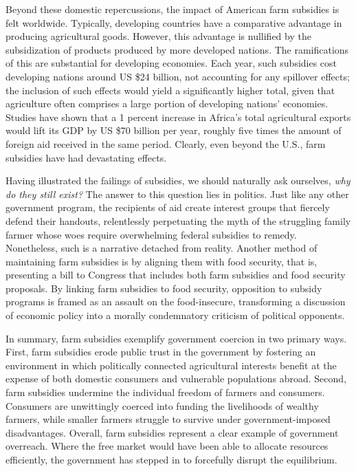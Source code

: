 Beyond these domestic repercussions, the impact of American farm subsidies is felt worldwide. Typically, developing countries have a comparative advantage in producing agricultural goods. However, this advantage is nullified by the subsidization of products produced by more developed nations. The ramifications of this are substantial for developing economies. Each year, such subsidies cost developing nations around US \$24 billion, not accounting for any spillover effects; the inclusion of such effects would yield a significantly higher total, given that agriculture often comprises a large portion of developing nations’ economies. Studies have shown that a 1 percent increase in Africa’s total agricultural exports would lift its GDP by US \$70 billion per year, roughly five times the amount of foreign aid received in the same period. Clearly, even beyond the U.S., farm subsidies have had devastating effects. 

Having illustrated the failings of subsidies, we should naturally ask ourselves, \emph{why do they still exist?}  The answer to this question lies in politics. Just like any other government program, the recipients of aid create interest groups that fiercely defend their handouts, relentlessly perpetuating the myth of the struggling family farmer whose woes require overwhelming federal subsidies to remedy. Nonetheless, such is a narrative detached from reality. Another method of maintaining farm subsidies is by aligning them with food security, that is, presenting a bill to Congress that includes both farm subsidies and food security proposals. By linking farm subsidies to food security, opposition to subsidy programs is framed as an assault on the food-insecure, transforming a discussion of economic policy into a morally condemnatory criticism of political opponents.  

In summary, farm subsidies exemplify government coercion in two primary ways. First, farm subsidies erode public trust in the government by fostering an environment in which politically connected agricultural interests benefit at the expense of both domestic consumers and vulnerable populations abroad. Second, farm subsidies undermine the individual freedom of farmers and consumers. Consumers are unwittingly coerced into funding the livelihoods of wealthy farmers, while smaller farmers struggle to survive under government-imposed disadvantages. Overall, farm subsidies represent a clear example of government overreach. Where the free market would have been able to allocate resources efficiently, the government has stepped in to forcefully disrupt the equilibrium. 


